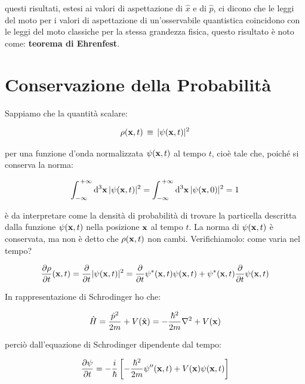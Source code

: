 	questi risultati, estesi ai valori di aspettazione di $\hat{x}$ e di $\hat{p}$, ci dicono che le leggi del moto per i valori di aspettazione di un'osservabile quantistica coincidono con le leggi del moto classiche per la stessa grandezza fisica, questo risultato è noto come: \textbf{teorema di Ehrenfest}.

\section{Conservazione della Probabilità}

	Sappiamo che la quantità scalare:
	
\begin{align*}
	\rho( \vb{x}, t) \, \equiv \, |\psi(\vb{x}, t)|^2
\end{align*}

	per una funzione d'onda normalizzata $\psi(\vb{x}, t)$ al tempo $t$, cioè tale che, poiché si conserva la norma:
	
\begin{align*}
	\int_{-\infty}^{\, + \infty} \dd^3 \vb{x} \, |\psi(\vb{x}, t)|^2 = \int_{-\infty}^{\, + \infty} \dd^3 \vb{x} \, |\psi(\vb{x}, 0)|^2 = 1
\end{align*}
	
	è da interpretare come la densità di probabilità di trovare la particella descritta dalla funzione $\psi(\vb{x}, t)$ nella posizione $\vb{x}$ al tempo $t$. La norma di $\psi(\vb{x}, t)$ è conservata, ma non è detto che $\rho(\vb{x}, t)$ non cambi. Verifichiamolo: come varia nel tempo?
	
\begin{align*}
	\pdv{\rho}{t}\qty(\vb{x}, t) = \pdv{t} |\psi(\vb{x}, t)|^2 = \pdv{t}\psi^*\qty(\vb{x}, t)\psi(\vb{x}, t) + \psi^*(\vb{x}, t) \pdv{t} \psi(\vb{x}, t)
\end{align*}

	In rappresentazione di Schrodinger ho che:
	
\begin{align*}
	\hat{H} = \frac{\hat{p}^2}{2m} + V(\hat{\vb{x}}) = - \frac{\hbar^2}{2m} \nabla^2 + V(\vb{x})
\end{align*}

	perciò dall'equazione di Schrodinger dipendente dal tempo:
	
\begin{align*}
	\pdv{\psi}{t}(\vb{x}, t) = - \frac{i}{\hbar} \, \qty[ - \frac{\hbar^2}{2m} \psi''(\vb{x}, t) + V(\vb{x})\psi(\vb{x}, t)]
\end{align*}

